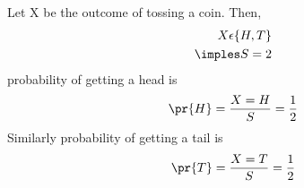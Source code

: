 Let X be the outcome of tossing a coin. Then,
\begin{align}
X \epsilon \{H,T\}
\\
\imples S=2
\end{align}
probability of getting a head is
\begin{align}
\pr{H}=\frac{X=H}{S}=\frac{1}{2}
\end{align}
Similarly probability of getting a tail is
\begin{align}
\pr{T}=\frac{X=T}{S}=\frac{1}{2}
\end{align}
